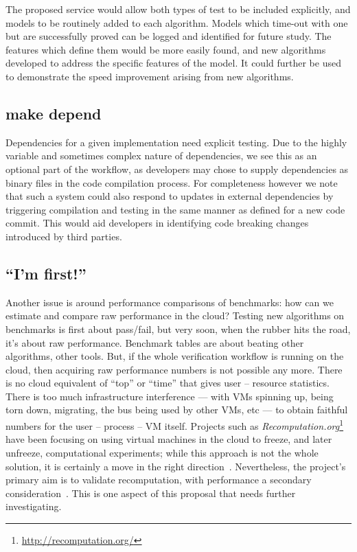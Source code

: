 \documentclass{llncs}
\begin{document}
The proposed service would allow both types of test to be included explicitly,
and models to be routinely added to each algorithm. Models which time-out with
one but are successfully proved can be logged and identified for future study.
The features which define them would be more easily found, and new algorithms
developed to address the specific features of the model. It could further be
used to demonstrate the speed improvement arising from new algorithms.

\subsection{make depend}

Dependencies for a given implementation need explicit
testing. Due to the highly variable and sometimes complex nature of
dependencies, we see this as an optional part of the workflow, as
developers may chose to supply dependencies as binary files in the
code compilation process. For completeness however we note that such a
system could also respond to updates in external dependencies by
triggering compilation and testing in the same manner as defined for a
new code commit. This would aid developers in identifying code
breaking changes introduced by third parties.

\subsection{``I'm first!''}

Another issue is around performance comparisons of benchmarks: how can
we estimate and compare raw performance in the cloud? Testing new
algorithms on benchmarks is first about pass/fail, but very soon, when
the rubber hits the road, it's about raw performance. Benchmark tables
are about beating other algorithms, other tools. But, if the whole
verification workflow is running on the cloud, then acquiring raw
performance numbers is not possible any more. There is no cloud
equivalent of ``top'' or ``time'' that gives user -- resource
statistics. There is too much infrastructure interference --- with VMs
spinning up, being torn down, migrating, the bus being used by other
VMs, etc --- to obtain faithful numbers for the user -- process -- VM
itself. Projects such as
{\emph{Recomputation.org}}\footnote{\url{http://recomputation.org/}}
have been focusing on using virtual machines in the cloud to freeze,
and later unfreeze, computational experiments; while this approach is
not the whole solution, it is certainly a move in the right
direction~\cite{arabas-et-al:2014}. Nevertheless, the project's
primary aim is to validate recomputation, with performance a secondary
consideration~\cite{gent:2013}. This is one aspect of this proposal
that needs further investigating.
\end{document}
